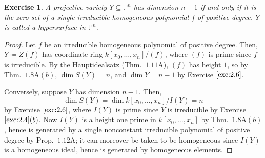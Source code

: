 \documentclass[12pt,letterpaper]{article}
\newtheorem{problem}{Exercise}[section]
\theoremstyle{definition}
\theoremstyle{remark}
\numberwithin{equation}{section}
\numberwithin{figure}{problem}
\let\AA\relax
\DeclareMathOperator{\AA}{\mathbb{A}}
\newcommand{\PP}{\mathbb{P}}
\begin{document}
\begin{problem}\label{exc:2.8}
  A projective variety $Y \subseteq \PP^n$ has dimension $n-1$ if
  and only if it is the zero set of a single irreducible homogeneous polynomial
  $f$ of positive degree. $Y$ is called a \emph{hypersurface} in $\PP^n$. 
\end{problem}
\begin{proof}
  Let $f$ be an irreducible homogeneous polynomial of positive degree. Then,
  $Y \coloneqq Z(f)$ has coordinate ring $k[x_0,\ldots,x_n]/(f)$, where $(f)$ is
  prime since $f$ is irreducible. By the Hauptidealsatz (Thm.~$1.11$A), $(f)$ has
  height $1$, so by Thm.~$1.8$A$(b)$, $\dim S(Y) = n$, and $\dim Y = n-1$ by
  Exercise $\ref{exc:2.6}$.
  \par Conversely, suppose $Y$ has dimension $n-1$. Then,
  \[ \dim S(Y) = \dim k[x_0,\ldots,x_n]/I(Y) = n\]
  by Exercise $\ref{exc:2.6}$, where $I(Y)$ is
  prime since $Y$ is irreducible by Exercise $\ref{exc:2.4}(b)$. Now $I(Y)$ is a
  height one prime in $k[x_0,\ldots,x_n]$ by Thm.~$1.8$A$(b)$, hence is
  generated by a single nonconstant irreducible polynomial of positive degree
  by Prop.~$1.12$A; it can moreover be taken to be homogeneous since $I(Y)$ is a
  homogeneous ideal, hence is generated by homogeneous elements.
\end{proof}
\end{document}
